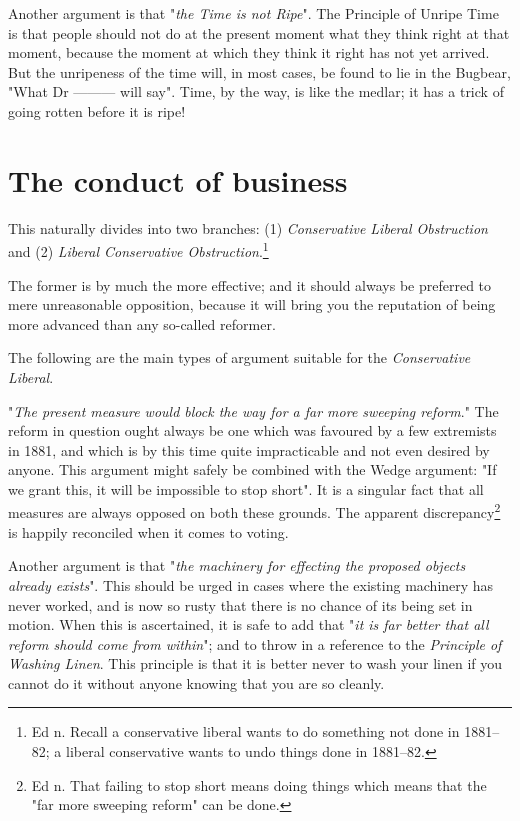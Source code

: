 \documentclass[12pt, oneside, b5paper]{memoir}
\begin{document}
Another argument is that "\emph{the Time is not Ripe}". The Principle of Unripe Time is that people should not do at the present moment what they think right at that moment, because the moment at which they think it right has not yet arrived. But the unripeness of the time will, in most cases, be found to lie in the Bugbear, "What Dr --------- will say". Time, by the way, is like the medlar; it has a trick of going rotten before it is ripe!

\chapter{The conduct of business}

This naturally divides into two branches: (1) \emph{Conservative Liberal Obstruction} and (2) \emph{Liberal Conservative Obstruction}.\footnote{Ed n. Recall a conservative liberal wants to do something not done in 1881--82; a liberal conservative wants to undo things done in 1881--82.}

The former is by much the more effective; and it should always be preferred to mere unreasonable opposition, because it will bring you the reputation of being more advanced than any so-called reformer.

The following are the main types of argument suitable for the \emph{Conservative Liberal}.

"\emph{The present measure would block the way for a far more sweeping reform}." The reform in question ought always be one which was favoured by a few extremists in 1881, and which is by this time quite impracticable and not even desired by anyone. This argument might safely be combined with the Wedge argument: "If we grant this, it will be impossible to stop short". It is a singular fact that all measures are always opposed on both these grounds. The apparent discrepancy\footnote{Ed n. That failing to stop short means doing things which means that the "far more sweeping reform" can be done.} is happily reconciled when it comes to voting.

\label{linen}
Another argument is that "\emph{the machinery for effecting the proposed objects already exists}". This should be urged in cases where the existing machinery has never worked, and is now so rusty that there is no chance of its being set in motion. When this is ascertained, it is safe to add that "\emph{it is far better that all reform should come from within}"; and to throw in a reference to the \emph{Principle of Washing Linen}. This principle is that it is better never to wash your linen if you cannot do it without anyone knowing that you are so cleanly.
\end{document}
